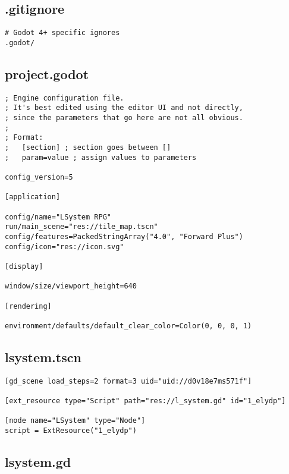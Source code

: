 \subsection{.gitignore}

\begin{lstlisting}
# Godot 4+ specific ignores
.godot/
\end{lstlisting}

\subsection{project.godot}

\begin{lstlisting}
; Engine configuration file.
; It's best edited using the editor UI and not directly,
; since the parameters that go here are not all obvious.
;
; Format:
;   [section] ; section goes between []
;   param=value ; assign values to parameters

config_version=5

[application]

config/name="LSystem RPG"
run/main_scene="res://tile_map.tscn"
config/features=PackedStringArray("4.0", "Forward Plus")
config/icon="res://icon.svg"

[display]

window/size/viewport_height=640

[rendering]

environment/defaults/default_clear_color=Color(0, 0, 0, 1)
\end{lstlisting}

\subsection{l\textunderscore{}system.tscn}

\begin{lstlisting}
[gd_scene load_steps=2 format=3 uid="uid://d0v18e7ms571f"]

[ext_resource type="Script" path="res://l_system.gd" id="1_elydp"]

[node name="LSystem" type="Node"]
script = ExtResource("1_elydp")
\end{lstlisting}

\subsection{l\textunderscore{}system.gd}

